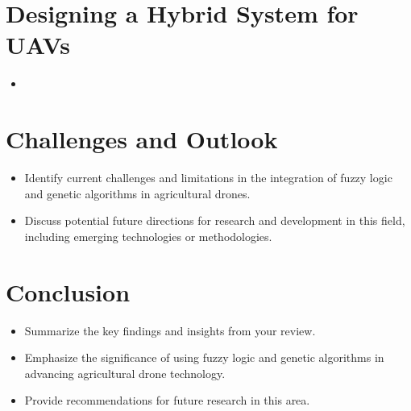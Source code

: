 \documentclass{IEEEtran}
\begin{document}
\section{Designing a Hybrid System for UAVs}
    \begin{itemize}
        \item 
    \end{itemize}

\section{Challenges and Outlook}
    \begin{itemize}
        \item Identify current challenges and limitations in the integration of fuzzy logic and genetic algorithms in agricultural drones.
        \item Discuss potential future directions for research and development in this field, including emerging technologies or methodologies. \cite{key4}
    \end{itemize}

\section{Conclusion}
    \begin{itemize}
        \item Summarize the key findings and insights from your review.
        \item Emphasize the significance of using fuzzy logic and genetic algorithms in advancing agricultural drone technology.
        \item Provide recommendations for future research in this area.
    \end{itemize}



\end{document}
